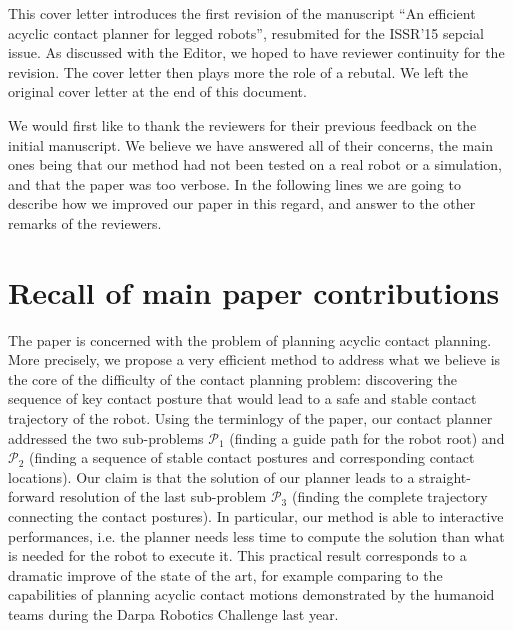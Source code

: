 \documentclass[12pt]{article}
\begin{document}
\maketitle

This cover letter introduces the first revision of the manuscript ``An efficient acyclic contact planner for legged robots'', resubmited for the ISSR'15 sepcial issue.
As discussed with the Editor, we hoped to have reviewer continuity for the revision.
The cover letter then plays more the role of a rebutal.
We left the original cover letter at the end of this document.

We would first like to thank the reviewers for their previous feedback on the initial manuscript. We believe we have answered
all of their concerns, the main ones being that our method had not been tested on a real robot or a simulation, and that the paper was too verbose.
In the following lines we are going to describe how we improved our paper in this regard, and answer to the other remarks of the reviewers.

\section{Recall of main paper contributions}
The paper is concerned with the problem of planning acyclic contact planning. 
More precisely, we propose a very efficient method to address what we believe is the core of the difficulty of the contact planning problem: discovering the sequence of key contact posture that would lead to a safe and stable contact trajectory of the robot. 
Using the terminlogy of the paper, our contact planner addressed the two sub-problems $\mathcal{P}_1$ (finding a guide path for the robot root) and $\mathcal{P}_2$ (finding a sequence of stable contact postures and corresponding contact locations).
Our claim is that the solution of our planner leads to a straight-forward resolution of the last sub-problem $\mathcal{P}_3$ (finding the complete trajectory connecting the contact postures).
In particular, our method is able to interactive performances, i.e. the planner needs less time to compute the solution than what is needed for the robot to execute it.
This practical result corresponds to a dramatic improve of the state of the art, for example comparing to the capabilities of planning acyclic contact motions demonstrated by the humanoid teams during the Darpa Robotics Challenge last year.
\end{document}
